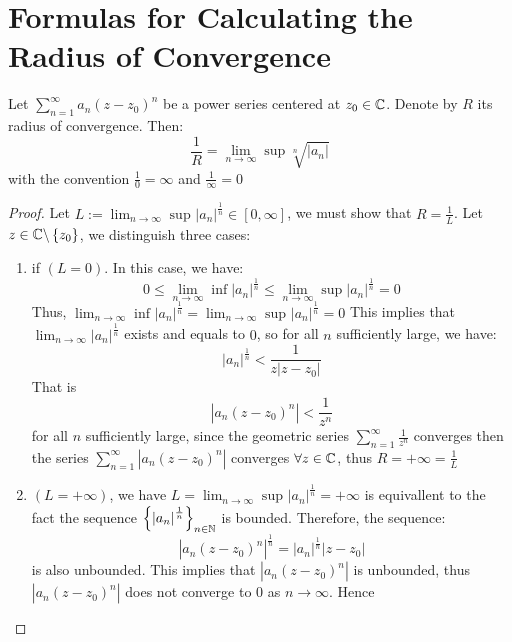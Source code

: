 \section{Formulas for Calculating the Radius of Convergence}
\begin{proposition}
  Let $\sum_{n=1}^{\infty} a_n (z-z_0) ^n  $ be a power series centered at 
  $z_0 \in \mathbb{C}$. Denote by $R $ its radius of convergence. Then: 
  \[
  \frac{1}{R} = 
  \lim_{n \to \infty} \sup_{} 
  \sqrt[n]{\left| a_n  \right|}
  \]
  with the convention $\frac{1}{0} = \infty  $  and $\frac{1}{\infty }= 0 $ 
\end{proposition}
\begin{proof}
  Let $L := \lim_{n \to \infty} \sup_{} \left| a_n  \right|^{\frac{1}{n}} \in \left[ 0, \infty  \right]$, 
  we must show that $R = \frac{1}{L} $. Let $z \in  \mathbb{C} \backslash \left\{ z_0 \right\} $, we distinguish 
  three cases:
  \begin{enumerate}
    \item if $(L = 0)  $. In this case, we have:
      \[
        0 \leq  \lim_{n \to \infty} \inf_{} \left| a_n  \right|^{\frac{1}{n}} \leq 
        \lim_{n \to \infty} \sup_{} 
        \left| a_n  \right|^{\frac{1}{n}} = 0
      \]
      Thus, $\lim_{n \to \infty} \inf_{} \left| a_n  \right|^{\frac{1}{n}} = \lim_{n \to \infty} \sup_{} 
      \left| a_n  \right|^{\frac{1}{n}} = 0$
  This implies that $\lim_{n \to \infty} \left| a_n  \right|^{\frac{1}{n}} $ exists and equals to $0$, so for all
  $n $ sufficiently large, we have: 
  \[
    \left| a_n  \right|^{\frac{1}{n}} <  
    \frac{1}{z \left| z-z_0 \right|} 
  \]
  That is 
  \[
  \left| a_n (z-z_0) ^n  \right| <  
  \frac{1}{z^n }
  \]
  for all $n $ sufficiently large, since the geometric series $\sum_{n=1}^{\infty} \frac{1}{z^{n}} $ converges
  then the series $\sum_{n=1}^{\infty} \left| a_n (z-z_0) ^n  \right| $ converges 
  $\forall z \in  \mathbb{C}  $, thus $R = +\infty = \frac{1}{L}$ 
 \item $(L = +\infty )$, we have $L = \lim_{n \to \infty} \sup_{} \left| a_n  \right|^{\frac{1}{n}} = +\infty $ is 
   equivallent to the fact the sequence $\left\{ \left| a_n  \right|^{\frac{1}{n}} \right\}_{n \in \mathbb{N}} $ is bounded.
   Therefore, the sequence: 
   \[
   \left| a_n (z-z_0) ^n \right|^{\frac{1}{n}} = 
   \left| a_n  \right|^{\frac{1}{n}} \left| 
   z-z_0\right| 
   \]
   is also unbounded. This implies that $\left| a_n (z-z_0) ^n  \right| $ is unbounded, thus 
   $\left| a_n (z-z_0) ^n  \right|$ does not converge to $0 $ as $n \rightarrow \infty  $. Hence 

\end{enumerate}
\end{proof}
